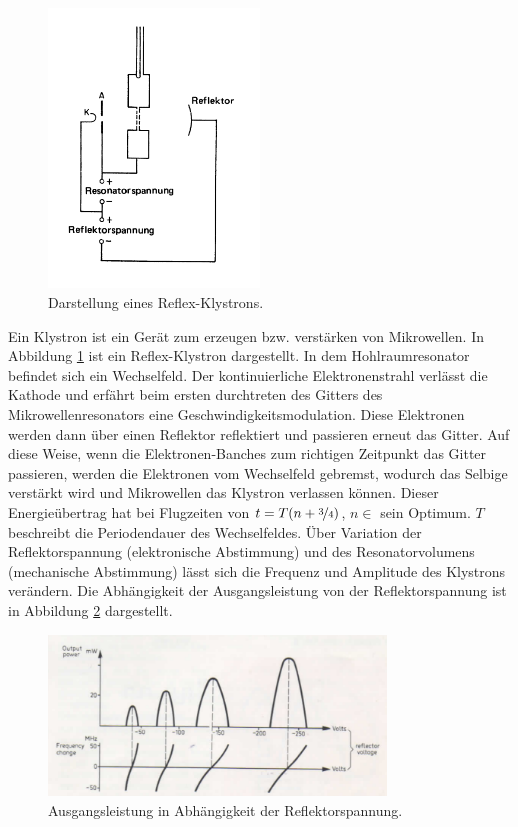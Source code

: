 \begin{figure}
    \centering
    \includegraphics[width=0.5\textwidth]{Bilder/reflex_klystron.PNG}
    \caption{Darstellung eines Reflex-Klystrons.}
    \label{fig:klystron}
\end{figure}

Ein Klystron ist ein Gerät zum erzeugen bzw. verstärken von Mikrowellen. In Abbildung \ref{fig:klystron} ist ein Reflex-Klystron dargestellt. In dem Hohlraumresonator befindet sich ein Wechselfeld. Der kontinuierliche Elektronenstrahl verlässt die Kathode und erfährt beim ersten durchtreten des Gitters des Mikrowellenresonators eine Geschwindigkeitsmodulation. Diese Elektronen werden dann über einen Reflektor reflektiert und passieren erneut das Gitter. Auf diese Weise, wenn die Elektronen-Banches zum richtigen Zeitpunkt das Gitter passieren, werden die Elektronen vom Wechselfeld gebremst, wodurch das Selbige verstärkt wird und Mikrowellen das Klystron verlassen können. Dieser Energieübertrag hat bei Flugzeiten von $t = T(n+\nicefrac{3}{4})$, $n \in $ sein Optimum. $T$ beschreibt die Periodendauer des Wechselfeldes. Über Variation der Reflektorspannung (elektronische Abstimmung) und des Resonatorvolumens (mechanische Abstimmung)
lässt sich die Frequenz und Amplitude des Klystrons verändern. Die Abhängigkeit der Ausgangsleistung von der Reflektorspannung ist in Abbildung \ref{fig:reflektor} dargestellt.

\begin{figure}
    \centering
    \includegraphics[width=0.8\textwidth]{Bilder/reflektor.PNG}
    \caption{Ausgangsleistung in Abhängigkeit der Reflektorspannung.}
    \label{fig:reflektor}
\end{figure}


